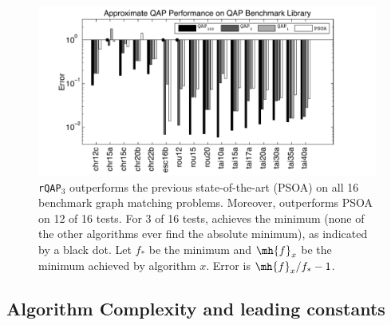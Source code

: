 \documentclass[10pt,journal,cspaper,compsoc]{IEEEtran}
\begin{document}

\begin{figure}[htbp]
	\centering			
	\includegraphics[width=1.0\linewidth]{../figs/benchmarks.pdf}
	\caption{\texttt{rQAP}$_3$ outperforms the previous state-of-the-art (PSOA) on all 16 benchmark graph matching problems.  Moreover, \rqapa outperforms PSOA on 12 of 16 tests.  For 3 of 16 tests, \rqapb achieves the minimum (none of the other algorithms ever find the absolute minimum), as indicated by a black dot.  Let $f_*$ be the minimum and $\mh{f}_x$ be the minimum achieved by algorithm $x$.  Error is $\mh{f}_x/f_*-1$.  }
	\label{fig:fwpath}
\end{figure}




\subsection{Algorithm Complexity and leading constants} %
\label{sub:algorithm_complexity_and_leading_constants}
\end{document}
